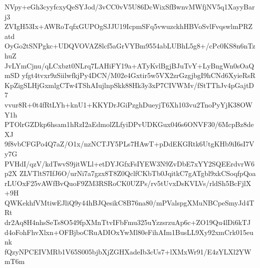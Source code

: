 NVpy+eGh3cyyfcxyQeSYJod/3vCC0vV5U86DcWixSfBwnvMWfjNV5q1XayyBarj3
ZVIgH53Ix+AWRoTqfxGUPOgSJJU19IcpmSFq5vwuzckhHBVoSvlFvqswlmPRZatd
OyGo2tSNPgkc+UDQVOVAZ8lcf5aGrVYBm9554abLUBhL5g8+/cPc0KS8n6nTzhuZ
JvLYmCjnu/qLCxbzt0NLrq7LAHiFY19a+ATyKvlBgjBJuTvY+LyBngWn0sOaQmSD
yfgt4tvxr9zSiilwfkjPy4DCN/M02e4Gxtir5w5VX2zrGzgjbgI9hCNd6XyieRsR
KpZigSLHjGxmlgCTw4TShAIujlnpSkk88Hk3y3xP7CIVWMv/fStTThJv4pGajtD7
vvur8R+0t4fRtLYh+knU1+KKYDrJGiPzghDueyjT6Xh103vu2TnoPyYjK38OWY1h
PTOlrGZDkp6hsam1hRzI2aEdmolZLfyiDPvUDKGux046s6ONVF30/6McpBz8deXJ
9f8vbCFGPo4Q7aZ/O1x/nzNCTJY5PLs7HAwT+pDdEKGRtk6UtgKHb9iI6sI7Vy7G
PVHdI/qzV/kdTwvS9jitWLl+etDYJGfxFsIYEW3N9ZvDbE7xYY2SQEErdvrW6p2X
ZLVTltS7IfJ6O/urNi7a7gzx8T8Z0QclfCKbTb0JqitkC7gATgbl9xkCSoqfpQoa
rLUOxF25vAWfBvQuoF9ZM3RSRoCK0UZPs/rv5tUvxDsKVLVs/rldSh5BcFjlX+9H
QWKekhfVMtiwEJliQ9y44hBJQesikC8B76na80/mPValspgXMuNBCpeSmyJd4TRt
dr2Aq8H4nhsSeTs8O549fpXMnTtvIFbFmu325uYzzsrzuAp6c+ZO19Qu4lDi6kTJ
d4oFohFhvXlxn+OFBjboCRuADIOxYwMl80eFihAIm1BusLL9Xy92xmCrk015eunk
fQzyNPCEIVMRb1V65S005bjbXjZGHXadeIb3cUs7+lXMxWr91/E4zYLXl2YWmT6m
